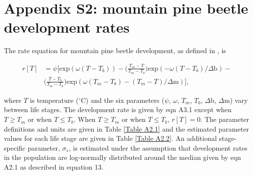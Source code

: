 \documentclass[12pt]{article}
\begin{document}
\section*{Appendix S2: mountain pine beetle development rates}

\renewcommand{\thetable}{A2.\arabic{table}}
\setcounter{table}{0}

\FloatBarrier

The rate equation for mountain pine beetle development, as defined in \citet{Regniere2012a}, is 

\begin{align*}
r[T] &= \psi\bigg[\text{exp}(\omega(T-T_b)) - \bigg(\frac{T_m - T}{T_m - T_b}\bigg)\text{exp}(-\omega(T - T_b)/\Delta\text{b}) - \\
&\bigg(\frac{T - T_b}{T_m - T_b}\bigg)\text{exp}(\omega(T_m - T_b) - (T_m - T)/\Delta \text{m})\bigg], \tag{eqn A2.1}
\end{align*}

where $T$ is temperature ($^\circ$C) and the six parameters ($\psi$, $\omega$, $T_m$, $T_b$, $\Delta \text{b}$, $\Delta \text{m}$) vary between life stages.  The development rate is given by eqn A3.1 except when $T \geq T_m$ or when $T \leq T_b$. When $T \geq T_m$ or when $T \leq T_b$, $r[T] = 0$. The parameter definitions and units are given in Table \ref{Table A2.1} and the estimated parameter values for each life stage are given in Table \ref{Table A2.2}. An additional stage-specific parameter, $\sigma_s$, is estimated under the assumption that development rates in the population are log-normally distributed around the median given by eqn A2.1 as described in equation 13.

\end{document}
